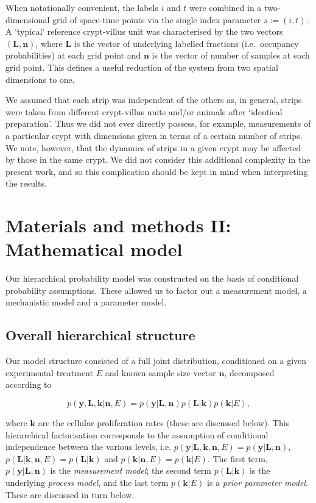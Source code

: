 \documentclass[10pt,letterpaper]{article}
\begin{document}
When notationally convenient, the labels \(i\) and \(t\) were combined
in a two-dimensional grid of space-time points via the single index
parameter \(s := (i,t)\). A `typical' reference crypt-villus unit was
characterised by the two vectors \((\mathbf{L},\mathbf{n})\), where
\(\mathbf{L}\) is the vector of underlying labelled fractions
(i.e.~occupancy probabilities) at each grid point and \(\mathbf{n}\) is
the vector of number of samples at each grid point. This defines a
useful reduction of the system from two spatial dimensions to one.

We assumed that each strip was independent of the others as, in general,
strips were taken from different crypt-villus units and/or animals after
`identical preparation'. Thus we did not ever directly possess, for
example, measurements of a particular crypt with dimensions given in
terms of a certain number of strips. We note, however, that the dynamics
of strips in a given crypt may be affected by those in the same crypt.
We did not consider this additional complexity in the present work, and
so this complication should be kept in mind when interpreting the
results.

\section{Materials and methods II: Mathematical
model}\label{materials-and-methods-ii-mathematical-model}

Our hierarchical probability model was constructed on the basis of
conditional probability assumptions. These allowed us to factor out a
measurement model, a mechanistic model and a parameter model.

\subsection{Overall hierarchical
structure}\label{overall-hierarchical-structure}

Our model structure consisted of a full joint distribution, conditioned
on a given experimental treatment \(E\) and known sample size vector
\(\mathbf{n}\), decomposed according to

\begin{equation}p(\mathbf{y},\mathbf{L},\mathbf{k}|\mathbf{n},E) = p(\mathbf{y}|\mathbf{L},\mathbf{n})p(\mathbf{L}|\mathbf{k})p(\mathbf{k}|E),\label{eq:decomp}\end{equation}

where \(\mathbf{k}\) are the cellular proliferation rates (these are
discussed below). This hierarchical factorisation corresponds to the
assumption of conditional independence between the various levels, i.e.
\(p(\mathbf{y}|\mathbf{L},\mathbf{k},\mathbf{n},E) = p(\mathbf{y}|\mathbf{L},\mathbf{n})\),
\(p(\mathbf{L}|\mathbf{k},\mathbf{n},E) = p(\mathbf{L}|\mathbf{k})\) and
\(p(\mathbf{k}|\mathbf{n},E) = p(\mathbf{k}|E)\). The first term,
\(p(\mathbf{y}|\mathbf{L},\mathbf{n})\) is the \emph{measurement model};
the second term \(p(\mathbf{L}|\mathbf{k})\) is the underlying
\emph{process model}, and the last term \(p(\mathbf{k}|E)\) is a
\emph{prior parameter model}. These are discussed in turn below.
\end{document}
